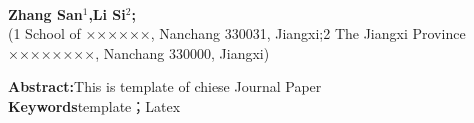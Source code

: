 \documentclass[a4paper,onecolumn,twoside]{article}
\begin{document}
            \begin{center}
              \parbox{\textwidth}{
                \begin{center}
                  {}\\
                  \vspace{-0.0cm}
                \end{center}
                \begin{center}
                  \textbf{Zhang San$^1$,Li Si$^2$;}\\[2pt]
                  \small{(1 School of ××××××, Nanchang 330031, Jiangxi;2 The
                  Jiangxi Province ××××××××, Nanchang 330000, Jiangxi)}\\[2pt]
                \end{center}
                {\small{\textbf{Abstract:}\quad This is template of chiese
                Journal Paper
                \\
                \textbf{Keywords}\quad template；Latex}}
              }
            \end{center}

\end{document}
